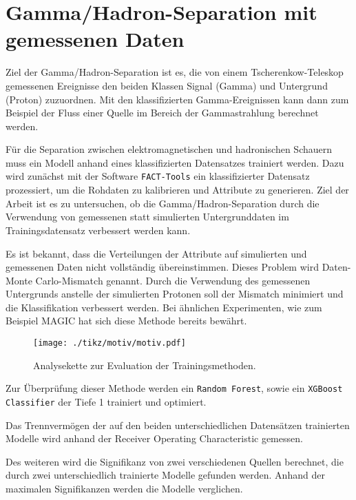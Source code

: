 \chapter{Gamma/Hadron-Separation mit gemessenen Daten}
Ziel der Gamma/Hadron-Separation ist es, die von einem Tscherenkow-Teleskop gemessenen Ereignisse den beiden Klassen Signal (Gamma) und Untergrund (Proton) zuzuordnen.
Mit den klassifizierten Gamma-Ereignissen kann dann zum Beispiel der Fluss einer Quelle im Bereich der Gammastrahlung berechnet werden.

Für die Separation zwischen elektromagnetischen und hadronischen Schauern muss ein Modell anhand eines klassifizierten Datensatzes trainiert werden.
Dazu wird zunächst mit der Software \texttt{FACT-Tools} \cite{Bockermann} ein klassifizierter Datensatz prozessiert, um die Rohdaten zu kalibrieren und Attribute zu generieren.
Ziel der Arbeit ist es zu untersuchen, ob die Gamma/Hadron-Separation durch die Verwendung von gemessenen statt simulierten Untergrunddaten im Trainingsdatensatz verbessert werden kann.

Es ist bekannt, dass die Verteilungen der Attribute auf simulierten und gemessenen Daten nicht vollständig übereinstimmen.
Dieses Problem wird Daten-Monte Carlo-Mismatch genannt.
Durch die Verwendung des gemessenen Untergrunds anstelle der simulierten Protonen soll der Mismatch minimiert und die Klassifikation verbessert werden.
Bei ähnlichen Experimenten, wie zum Beispiel MAGIC \cite{magic} hat sich diese Methode bereits bewährt. 
\begin{figure}[H]
  \centering
  \texttt{[image: ./tikz/motiv/motiv.pdf]}
  \caption{Analysekette zur Evaluation der Trainingsmethoden.}
\end{figure}
Zur Überprüfung dieser Methode werden ein \texttt{Random Forest}, sowie ein \texttt{XGBoost Classifier} der Tiefe 1 trainiert und optimiert.

Das Trennvermögen der auf den beiden unterschiedlichen Datensätzen trainierten Modelle wird anhand der Receiver Operating Characteristic gemessen.

Des weiteren wird die Signifikanz von zwei verschiedenen Quellen berechnet, die durch zwei unterschiedlich trainierte Modelle gefunden werden. 
Anhand der maximalen Signifikanzen werden die Modelle verglichen.
